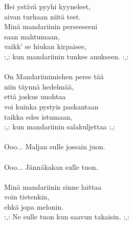 
            Hei ystävä pyyhi kyyneleet,  \\
            aivan turhaan niitä teet.  \\
            Minä mandariinin perseeseeni  \\
            saan mahtumaan,  \\
            vaikk' se hiukan kirpaisee,  \\
            :,: kun mandariinin tunkee anukseen. :,: \\
\hspace{10mm} \\
            On Mandariinimiehen perse tää  \\
            niin täynnä hedelmää,  \\
            että joskus unohtaa \\
            voi kuinka pystyis paskantaan  \\
            taikka edes istumaan,  \\
            :,: kun mandariinin salakuljettaa :,: \\
\hspace{10mm} \\
            Ooo... Maljan sulle jossain juon. \\
\hspace{10mm} \\
            Ooo... Jännäkakan sulle tuon. \\
\hspace{10mm} \\
            Minä mandariinin sinne laittaa \\
            voin tietenkin, \\
            ehkä jopa melonin.  \\
            :,: Ne sulle tuon kun saavun takaisin. :,: \\
